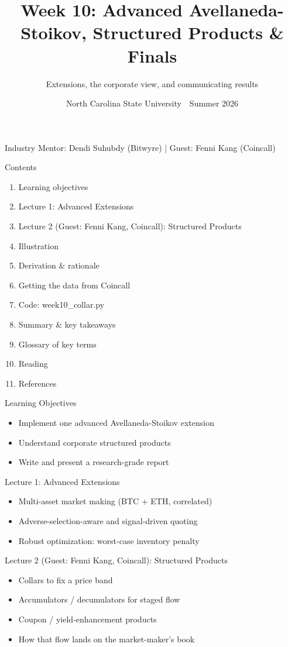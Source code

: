 \documentclass[aspectratio=169,10pt]{beamer}
\title{Week 10: Advanced Avellaneda-Stoikov, Structured Products \& Finals}
\subtitle{Extensions, the corporate view, and communicating results}
\date{North Carolina State University \,\textbar\, Summer 2026}
\begin{document}
\begin{frame}[plain]\titlepage\begin{center}\tiny Industry Mentor: Dendi Suhubdy (Bitwyre)  |  Guest: Fenni Kang (Coincall)\end{center}\end{frame}
\begin{frame}{Contents}
\small\begin{enumerate}\setlength{\itemsep}{3pt}
  \item Learning objectives
  \item Lecture 1: Advanced Extensions
  \item Lecture 2 (Guest: Fenni Kang, Coincall): Structured Products
  \item Illustration
  \item Derivation \& rationale
  \item Getting the data from Coincall
  \item Code: week10\_collar.py
  \item Summary \& key takeaways
  \item Glossary of key terms
  \item Reading
  \item References
\end{enumerate}
\end{frame}

\begin{frame}{Learning Objectives}
\begin{itemize}
  \item Implement one advanced Avellaneda-Stoikov extension
  \item Understand corporate structured products
  \item Write and present a research-grade report
\end{itemize}
\end{frame}

\begin{frame}{Lecture 1: Advanced Extensions}
\begin{itemize}
  \item Multi-asset market making (BTC + ETH, correlated)
  \item Adverse-selection-aware and signal-driven quoting
  \item Robust optimization: worst-case inventory penalty
\end{itemize}
\end{frame}

\begin{frame}{Lecture 2 (Guest: Fenni Kang, Coincall): Structured Products}
\begin{itemize}
  \item Collars to fix a price band
  \item Accumulators / decumulators for staged flow
  \item Coupon / yield-enhancement products
  \item How that flow lands on the market-maker's book
\end{itemize}
\end{frame}
\end{document}
